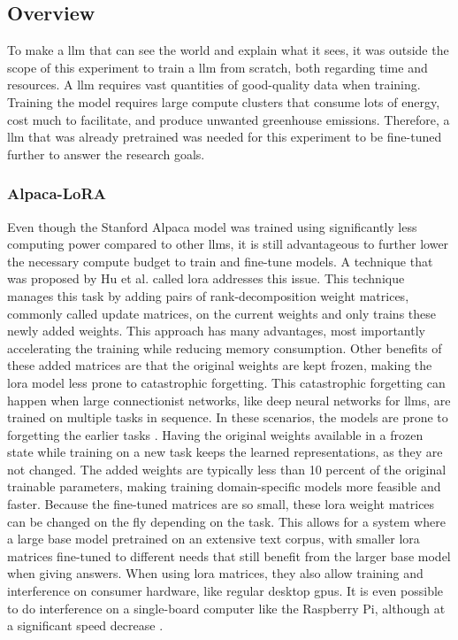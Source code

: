         \subsection{Overview}
        To make a \gls{llm} that can see the world and explain what it sees, it was outside the scope of this experiment to train a \gls{llm} from scratch, both regarding time and resources. A \gls{llm} requires vast quantities of good-quality data when training. Training the model requires large compute clusters that consume lots of energy, cost much to facilitate, and produce unwanted greenhouse emissions. Therefore, a \gls{llm} that was already pretrained was needed for this experiment to be fine-tuned further to answer the research goals. 
        


        \subsubsection{Alpaca-LoRA}
        Even though the Stanford Alpaca model was trained using significantly less computing power compared to other \glspl{llm}, it is still advantageous to further lower the necessary compute budget to train and fine-tune models. A technique that was proposed by Hu et al. called \gls{lora} \cite{huLoRALowRankAdaptation2021} addresses this issue. This technique manages this task by adding pairs of rank-decomposition weight matrices, commonly called update matrices, on the current weights and only trains these newly added weights. This approach has many advantages, most importantly accelerating the training while reducing memory consumption. Other benefits of these added matrices are that the original weights are kept frozen, making the \gls{lora} model less prone to catastrophic forgetting. This catastrophic forgetting can happen when large connectionist networks, like deep neural networks for \glspl{llm}, are trained on multiple tasks in sequence. In these scenarios, the models are prone to forgetting the earlier tasks \cite{mccloskeyCatastrophicInterferenceConnectionist1989}. Having the original weights available in a frozen state while training on a new task keeps the learned representations, as they are not changed. The added weights are typically less than 10 percent of the original trainable parameters, making training domain-specific models more feasible and faster. 
        Because the fine-tuned matrices are so small, these \gls{lora} weight matrices can be changed on the fly depending on the task. 
        This allows for a system where a large base model pretrained on an extensive text corpus, with smaller \gls{lora} matrices fine-tuned to different needs that still benefit from the larger base model when giving answers.
        When using \gls{lora} matrices, they also allow training and interference on consumer hardware, like regular desktop \glspl{gpu}. It is even possible to do interference on a single-board computer like the Raspberry Pi, although at a significant speed decrease \cite{artemandreenko[@miolini]VeSucefullyRunned2023}. 


